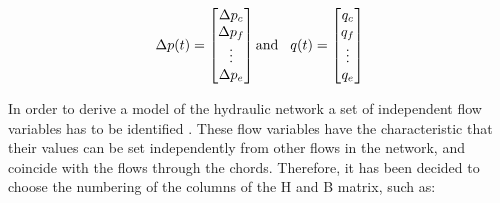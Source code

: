 
\begin{equation}
\Delta p(t) =
\begin{bmatrix}
         \Delta p_c \\
	\Delta p_f \\ 
	\vdots \\
	\Delta p_e \\
\end{bmatrix}
\text{and}\hspace{0.3cm}
q(t) =
\begin{bmatrix}
         q_c \\
	q_f \\ 
	\vdots \\
	q_e \\
\end{bmatrix}
\end{equation}


In order to derive a model of the hydraulic network a set of independent flow variables has to be identified \cite{TowerModel}. These flow variables have the characteristic 
that their values can be set independently from other flows in the network, and coincide with the flows through the chords. 
Therefore, it has been decided to choose the numbering of the columns of the 
H and B matrix, such as:



